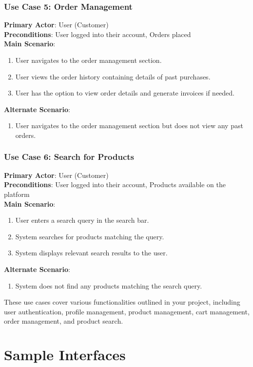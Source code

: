 \documentclass{article}
\begin{document}
\subsubsection{Use Case 5: Order Management}
\textbf{Primary Actor}: User (Customer) \\
\textbf{Preconditions}: User logged into their account, Orders placed \\
\textbf{Main Scenario}:
\begin{enumerate}
    \item User navigates to the order management section.
    \item User views the order history containing details of past purchases.
    \item User has the option to view order details and generate invoices if needed.
\end{enumerate}
\textbf{Alternate Scenario}:
\begin{enumerate}
    \item User navigates to the order management section but does not view any past orders.
\end{enumerate}

\subsubsection{Use Case 6: Search for Products}
\textbf{Primary Actor}: User (Customer) \\
\textbf{Preconditions}: User logged into their account, Products available on the platform \\
\textbf{Main Scenario}:
\begin{enumerate}
    \item User enters a search query in the search bar.
    \item System searches for products matching the query.
    \item System displays relevant search results to the user.
\end{enumerate}
\textbf{Alternate Scenario}:
\begin{enumerate}
    \item System does not find any products matching the search query.
\end{enumerate}

These use cases cover various functionalities outlined in your project, including user authentication, profile management, product management, cart management, order management, and product search.
\newpage
\section{Sample Interfaces}
\end{document}
